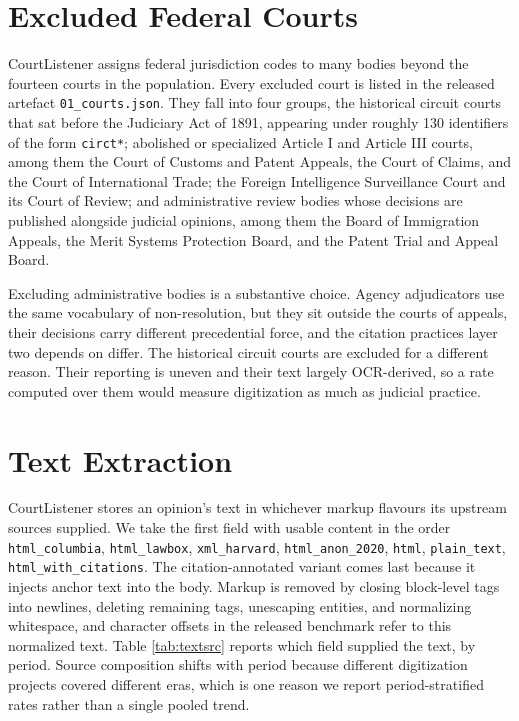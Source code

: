 \section{Excluded Federal Courts}
\label{app:courts}
CourtListener assigns federal jurisdiction codes to many bodies beyond the
fourteen courts in the population. Every excluded court is listed in the released
artefact \texttt{01\_courts.json}. They fall into four groups, the historical
circuit courts that sat before the Judiciary Act of 1891, appearing under roughly
130 identifiers of the form \texttt{circt*}; abolished or specialized Article I
and Article III courts, among them the Court of Customs and Patent Appeals, the
Court of Claims, and the Court of International Trade; the Foreign Intelligence
Surveillance Court and its Court of Review; and administrative review bodies
whose decisions are published alongside judicial opinions, among them the Board
of Immigration Appeals, the Merit Systems Protection Board, and the Patent Trial
and Appeal Board.

Excluding administrative bodies is a substantive choice. Agency adjudicators use
the same vocabulary of non-resolution, but they sit outside the courts of
appeals, their decisions carry different precedential force, and the citation
practices layer two depends on differ. The historical circuit courts are excluded
for a different reason. Their reporting is uneven and their text largely
OCR-derived, so a rate computed over them would measure digitization as much as
judicial practice.

\section{Text Extraction}
\label{app:text}

CourtListener stores an opinion's text in whichever markup flavours its upstream
sources supplied. We take the first field with usable content in the order
\texttt{html\_columbia}, \texttt{html\_lawbox}, \texttt{xml\_harvard},
\texttt{html\_anon\_2020}, \texttt{html}, \texttt{plain\_text},
\texttt{html\_with\_citations}. The citation-annotated variant comes last because
it injects anchor text into the body. Markup is removed by closing block-level
tags into newlines, deleting remaining tags, unescaping entities, and normalizing
whitespace, and character offsets in the released benchmark refer to this
normalized text. Table \ref{tab:textsrc} reports which field supplied the text, by
period. Source composition shifts with period because different digitization
projects covered different eras, which is one reason we report period-stratified
rates rather than a single pooled trend.


